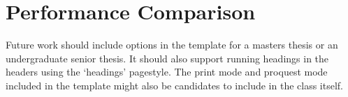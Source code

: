 \section{Performance Comparison}

Future work should include options in the template for a masters thesis or an undergraduate senior thesis. It should also support running headings in the headers using the `headings' pagestyle.  The print mode and proquest mode included in the template might also be candidates to include in the class itself. 

 